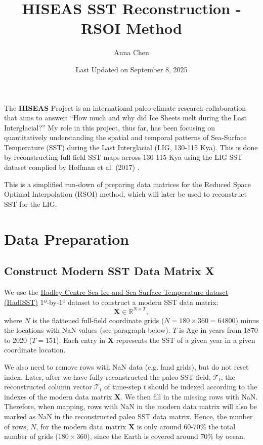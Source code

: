 \documentclass{article}
\title{HISEAS SST Reconstruction - RSOI Method}
\author{Anna Chen}
\date{Last Updated on September 8, 2025}
\begin{document}
\maketitle

The \textbf{HISEAS} Project is an international paleo-climate research collaboration that aims to answer: “How much and why did Ice Sheets melt during the Last Interglacial?” My role in this project, thus far, has been focusing on quantitatively understanding the spatial and temporal patterns of Sea-Surface Temperature (SST) during the Last Interglacial (LIG, 130-115 Kya). 
This is done by reconstructing full-field SST maps across 130-115 Kya using the LIG SST dataset complied by Hoffman et al. (2017) \cite{Hoffman2017}.

This is a simplified run-down of preparing data matrices for the Reduced Space Optimal Interpolation (RSOI) method, which will later be used to reconstruct SST for the LIG.

\section{Data Preparation}
\subsection{Construct Modern SST Data Matrix \textbf{X}}

We use the \ul{Hadley Centre Sea Ice and Sea Surface Temperature dataset (HadISST)} 1º-by-1º dataset \cite{HadISST} to construct a modern SST data matrix:
$$\textbf{X} \in \mathbb{R}^{N \times T},$$
where $N$ is the flattened full-field coordinate grids ($N = 180 \times 360 = 64800$) minus the locations with NaN values (see paragraph below).
$T$ is Age in years from 1870 to 2020 ($T=151$). Each entry in \textbf{X} represents the SST of a given year in a given coordinate location.

We also need to remove rows with NaN data (e.g. land grids), but do not reset index. Later, after we have fully reconstructed the paleo SST field, $\mathcal{T}_t$, the reconstructed column vector $\mathcal{T}_t$ of time-step $t$ should be indexed according to the indexes of the modern data matrix \textbf{X}. 
We then fill in the missing rows with NaN. Therefore, when mapping, rows with NaN in the modern data matrix will also be marked as NaN in the reconstructed paleo SST data matrix.
Hence, the number of rows, $N$, for the modern data matrix $\textbf{X}$ is only around 60-70\% the total number of grids ($180\times360$), since the Earth is covered around 70\% by ocean.
\end{document}
